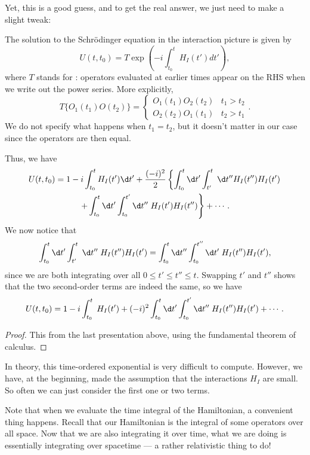 \documentclass[a4paper]{article}
\begin{document}
Yet, this is a good guess, and to get the real answer, we just need to make a slight tweak:
\begin{prop}
  The solution to the Schr\"odinger equation in the interaction picture is given by
  \[
    U(t, t_0) = T\exp\left(-i \int_{t_0}^t H_I(t') dt'\right),
  \]
  where $T$ stands for : operators evaluated at earlier times appear on the RHS when we write out the power series. More explicitly,
  \[
    T\{O_1(t_1) O(t_2)\} =
    \begin{cases}
      O_1(t_1) O_2(t_2) & t_1 > t_2\\
      O_2(t_2) O_1(t_1) & t_2 > t_1
    \end{cases}.
  \]
  We do not specify what happens when $t_1 = t_2$, but it doesn't matter in our case since the operators are then equal.

  Thus, we have
  \begin{multline*}
    U(t, t_0) = 1 - i \int_{t_0}^t H_I (t') \d t' + \frac{(-i)^2}{2} \left\{\int_{t_0}^t \d t' \int_{t'}^t\;\d t'' H_I(t'') H_I(t')\right.\\
    \left.+ \int_{t_0}^t \d t' \int_{t_0}^{t'} \d t''\; H_I(t') H_I(t'')\right\} + \cdots.
  \end{multline*}
  We now notice that
  \[
    \int_{t_0}^t \d t' \int_{t'}^t \;\d t''\; H_I(t'') H_I(t') = \int_{t_0}^t \d t'' \int_{t_0}^{t''}\d t'\; H_I(t'') H_I(t'),
  \]
  since we are both integrating over all $0 \leq t' \leq t'' \leq t$. Swapping $t'$ and $t''$ shows that the two second-order terms are indeed the same, so we have
  \[
    U(t, t_0) = 1 - i \int_{t_0}^t\; H_I (t') + (-i)^2 \int_{t_0}^t \d t' \int_{t_0}^{t'} \d t'' \; H_I(t'') H_I(t') + \cdots.
  \]
\end{prop}

\begin{proof}
  This from the last presentation above, using the fundamental theorem of calculus.
\end{proof}

In theory, this time-ordered exponential is very difficult to compute. However, we have, at the beginning, made the assumption that the interactions $H_I$ are small. So often we can just consider the first one or two terms.

Note that when we evaluate the time integral of the Hamiltonian, a convenient thing happens. Recall that our Hamiltonian is the integral of some operators over all space. Now that we are also integrating it over time, what we are doing is essentially integrating over spacetime --- a rather relativistic thing to do!
\end{document}
